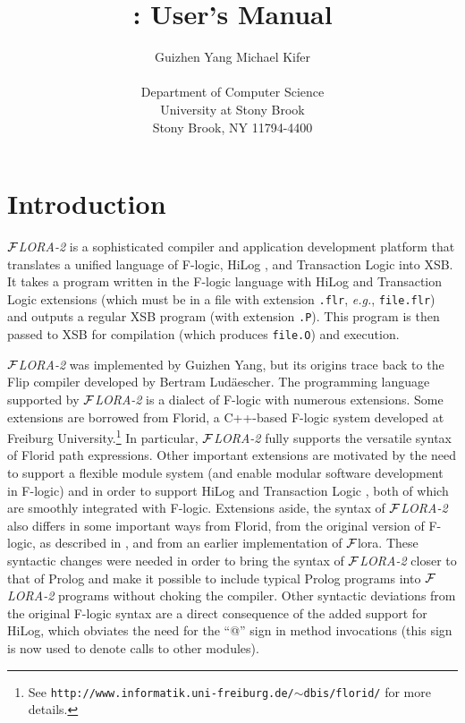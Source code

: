 \documentclass[11pt]{article}
\title{\FLORA: User's Manual}
\author{
  {Guizhen Yang
  \hspace{3cm}
  Michael Kifer}
  \\\\
  Department of Computer Science\\
  University at Stony Brook\\
  Stony Brook, NY 11794-4400
  }
\newcommand{\FLIP}{{\mbox{\sc Flip}}\xspace}
\newcommand{\FLORA}{{\mbox{${\cal F}${\small\it LORA}\rm\emph{-2}}}\xspace}
\newcommand{\FLORAone}{{\mbox{${\cal F}${\sc lora}}}\xspace}
\newcommand{\FLORID}{{\mbox{\sc Florid}}\xspace}
\newcommand{\fl}{\mbox{F-logic}\xspace}
\begin{document}
\maketitle
\thispagestyle{empty}

\newpage
{}
\setcounter{page}{1}

\tableofcontents

\newpage

\setcounter{page}{1}


\section{Introduction}

\FLORA is a sophisticated compiler and application development platform
that translates a unified language of \fl \cite{KLW95}, HiLog
\cite{hilog-jlp}, and Transaction Logic \cite{trans-tcs94} into XSB. It
takes a program written in the \fl language with HiLog and Transaction
Logic extensions (which must be in a file with extension {\tt .flr}, {\it
  e.g.}, {\tt file.flr}) and outputs a regular XSB program (with extension
{\tt .P}).  This program is then passed to XSB for compilation (which
produces {\tt file.O}) and execution.

\FLORA was implemented by Guizhen Yang, but its origins trace back to the
\FLIP compiler developed by Bertram Lud\"aescher.  The programming language
supported by \FLORA is a dialect of \fl with numerous extensions.  Some
extensions are borrowed from \FLORID, a C++-based \fl system developed at
Freiburg University.\footnote{
  See {\tt http://www.informatik.uni-freiburg.de/$\sim$dbis/florid/} for more
  details.
  }
In particular, \FLORA fully supports the versatile syntax of \FLORID path
expressions. Other important extensions are motivated by the need to
support a flexible module system (and enable modular software development
in \fl) and in order to support HiLog \cite{hilog-jlp} and Transaction
Logic \cite{trans-dbpl93,trans-iclp93,trans-tcs94}, both of which are
smoothly integrated with \fl. Extensions aside, the syntax of \FLORA also
differs in some important ways from \FLORID, from the original version of
\fl, as described in \cite{KLW95}, and from an earlier implementation
of \FLORAone. These syntactic changes were needed in order to bring the
syntax of \FLORA closer to that of Prolog and make it possible to include
typical Prolog programs into \FLORA programs without choking the compiler.
Other syntactic deviations from the original F-logic syntax are a direct
consequence of the added support for HiLog, which obviates the need for the
``@'' sign in method invocations (this sign is now used to denote calls to
other modules).
\end{document}
